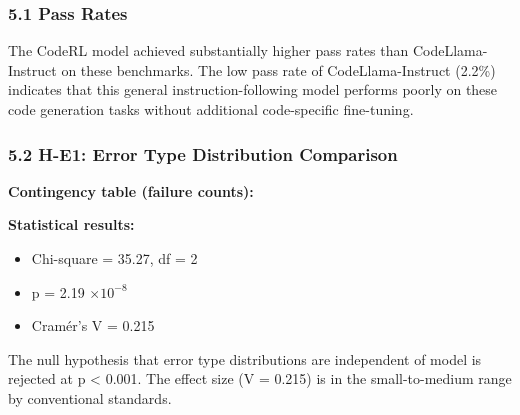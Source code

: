 
\subsubsection{5.1 Pass Rates}

\begin{table}[htbp]
\centering
{}
\end{table}

The CodeRL model achieved substantially higher pass rates than CodeLlama-Instruct on these benchmarks. The low pass rate of CodeLlama-Instruct (2.2\%) indicates that this general instruction-following model performs poorly on these code generation tasks without additional code-specific fine-tuning.

\subsubsection{5.2 H-E1: Error Type Distribution Comparison}

\textbf{Contingency table (failure counts):}

\begin{table}[htbp]
\centering
{}
\end{table}

\textbf{Statistical results:}
\begin{itemize}
\item Chi-square = 35.27, df = 2
\item p = 2.19 $\times 10^{-8}$
\item Cramér's V = 0.215
\end{itemize}

The null hypothesis that error type distributions are independent of model is rejected at p < 0.001. The effect size (V = 0.215) is in the small-to-medium range by conventional standards.

